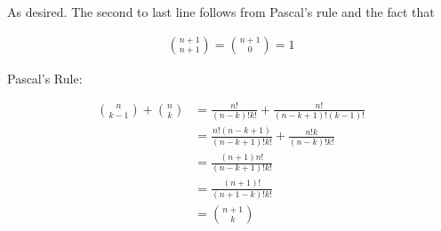 \documentclass[12pt]{article}
\begin{document}
As desired. The second to last line follows from Pascal's rule and the fact that

\begin{align}
\binom{n+1}{n+1} = \binom{n+1}{0} = 1
\end{align}

Pascal's Rule:

\begin{equation}
\begin{aligned}
\binom{n}{k-1} + \binom{n}{k} &= \frac{n!}{(n-k)!k!} + \frac{n!}{(n-k+1)!(k-1)!}\\
&= \frac{n!(n-k+1)}{(n-k+1)!k!} + \frac{n!k}{(n-k)!k!}\\
&= \frac{(n+1)n!}{(n-k+1)!k!}\\
&= \frac{(n+1)!}{(n+1-k)!k!}\\
&= \binom{n+1}{k}
\end{aligned}
\end{equation}
\end{document}
